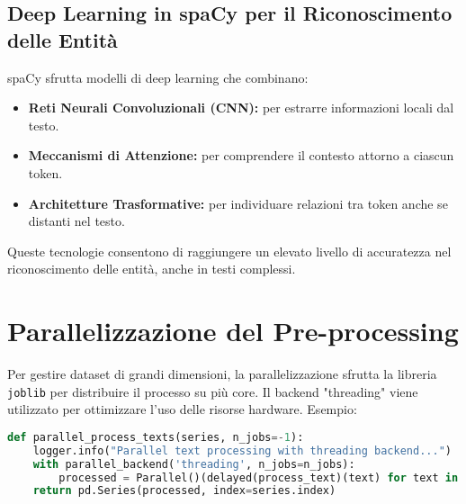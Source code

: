 \subsection{Deep Learning in spaCy per il Riconoscimento delle Entità} spaCy sfrutta modelli di deep learning che combinano:
\begin{itemize}
\item \textbf{Reti Neurali Convoluzionali (CNN):} per estrarre informazioni locali dal testo.
\item \textbf{Meccanismi di Attenzione:} per comprendere il contesto attorno a ciascun token.
\item \textbf{Architetture Trasformative:} per individuare relazioni tra token anche se distanti nel testo.
\end{itemize} Queste tecnologie consentono di raggiungere un elevato livello di accuratezza nel riconoscimento delle entità, anche in testi complessi.

\section{Parallelizzazione del Pre-processing}
Per gestire dataset di grandi dimensioni, la parallelizzazione sfrutta la libreria \texttt{joblib} per distribuire il processo su più core. Il backend "threading" viene utilizzato per ottimizzare l'uso delle risorse hardware. Esempio:

\begin{lstlisting}[language=Python,caption={Funzione parallel\_process\_texts}]
def parallel_process_texts(series, n_jobs=-1):
    logger.info("Parallel text processing with threading backend...")
    with parallel_backend('threading', n_jobs=n_jobs):
        processed = Parallel()(delayed(process_text)(text) for text in series)
    return pd.Series(processed, index=series.index)
\end{lstlisting}